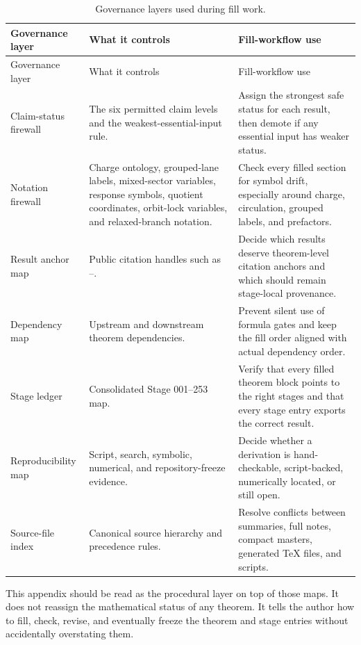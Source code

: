 \begin{longtable}{@{}L{0.30\textwidth}L{0.36\textwidth}L{0.24\textwidth}@{}}
\caption{Governance layers used during fill work.}\label{tab:fill-governing-maps}\\
\toprule
Governance layer & What it controls & Fill-workflow use \\
\midrule
\endfirsthead
\toprule
Governance layer & What it controls & Fill-workflow use \\
\midrule
\endhead
Claim-status firewall & The six permitted claim levels and the weakest-essential-input rule. & Assign the strongest safe status for each result, then demote if any essential input has weaker status. \\
\addlinespace
Notation firewall & Charge ontology, grouped-lane labels, mixed-sector variables, response symbols, quotient coordinates, orbit-lock variables, and relaxed-branch notation. & Check every filled section for symbol drift, especially around charge, circulation, grouped labels, and prefactors. \\
\addlinespace
Result anchor map & Public citation handles such as --. & Decide which results deserve theorem-level citation anchors and which should remain stage-local provenance. \\
\addlinespace
Dependency map & Upstream and downstream theorem dependencies. & Prevent silent use of formula gates and keep the fill order aligned with actual dependency order. \\
\addlinespace
Stage ledger & Consolidated Stage 001--253 map. & Verify that every filled theorem block points to the right stages and that every stage entry exports the correct result. \\
\addlinespace
Reproducibility map & Script, search, symbolic, numerical, and repository-freeze evidence. & Decide whether a derivation is hand-checkable, script-backed, numerically located, or still open. \\
\addlinespace
Source-file index & Canonical source hierarchy and precedence rules. & Resolve conflicts between summaries, full notes, compact masters, generated \TeX{} files, and scripts. \\
\bottomrule
\end{longtable}

This appendix should be read as the procedural layer on top of those maps.  It does not reassign the mathematical status of any theorem.  It tells the author how to fill, check, revise, and eventually freeze the theorem and stage entries without accidentally overstating them.

